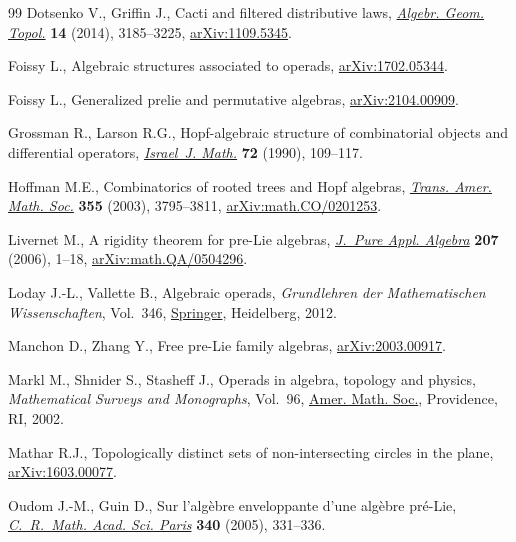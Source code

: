 \documentclass[pdftex]{sigma}
\numberwithin{equation}{section}
\begin{document}
\begin{thebibliography}{99}
Dotsenko V., Griffin J., Cacti and filtered distributive laws, \href{https://doi.org/10.2140/agt.2014.14.3185}{\textit{Algebr.
 Geom. Topol.}} \textbf{14} (2014), 3185--3225, \href{https://arxiv.org/abs/1109.5345}{arXiv:1109.5345}.

Foissy L., Algebraic structures associated to operads, \href{https://arxiv.org/abs/1702.05344}{arXiv:1702.05344}.

Foissy L., Generalized prelie and permutative algebras, \href{https://arxiv.org/abs/2104.00909}{arXiv:2104.00909}.

Grossman R., Larson R.G., Hopf-algebraic structure of combinatorial objects and
 differential operators, \href{https://doi.org/10.1007/BF02764614}{\textit{Israel~J. Math.}} \textbf{72} (1990),
 109--117.

Hoffman M.E., Combinatorics of rooted trees and {H}opf algebras, \href{https://doi.org/10.1090/S0002-9947-03-03317-8}{\textit{Trans.
 Amer. Math. Soc.}} \textbf{355} (2003), 3795--3811, \href{https://arxiv.org/abs/math.CO/0201253}{arXiv:math.CO/0201253}.

Livernet M., A rigidity theorem for pre-{L}ie algebras, \href{https://doi.org/10.1016/j.jpaa.2005.10.014}{\textit{J.~Pure Appl.
 Algebra}} \textbf{207} (2006), 1--18, \href{https://arxiv.org/abs/math.QA/0504296}{arXiv:math.QA/0504296}.

Loday J.-L., Vallette B., Algebraic operads, \textit{Grundlehren der
 Mathematischen Wissenschaften}, Vol.~346, \href{https://doi.org/10.1007/978-3-642-30362-3}{Springer}, Heidelberg, 2012.

Manchon D., Zhang Y., Free pre-{L}ie family algebras, \href{https://arxiv.org/abs/2003.00917}{arXiv:2003.00917}.

Markl M., Shnider S., Stasheff J., Operads in algebra, topology and physics,
 \textit{Mathematical Surveys and Monographs}, Vol.~96, \href{https://doi.org/10.1090/surv/096}{Amer. Math. Soc.},
 Providence, RI, 2002.

Mathar R.J., Topologically distinct sets of non-intersecting circles in the
 plane, \href{https://arxiv.org/abs/1603.00077}{arXiv:1603.00077}.

Oudom J.-M., Guin D., Sur l'alg\`ebre enveloppante d'une alg\`ebre pr\'e-{L}ie,
 \href{https://doi.org/10.1016/j.crma.2005.01.010}{\textit{C.~R.~Math. Acad. Sci. Paris}} \textbf{340} (2005), 331--336.


\end{thebibliography}
\end{document}

